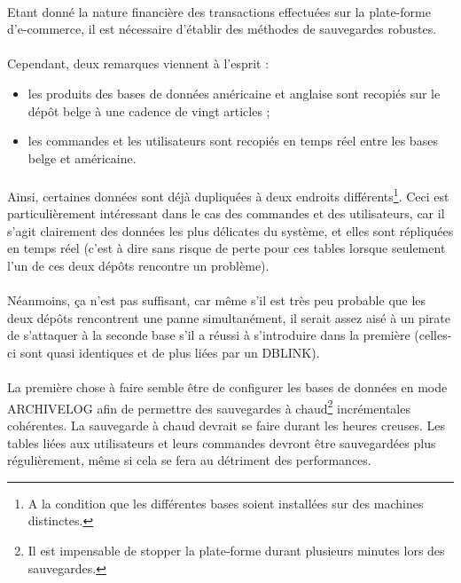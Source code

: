 \documentclass[a4paper,12pt,french]{article}
\begin{document}
    \paragraph{}
    Etant donné la nature financière des transactions effectuées sur la
plate-forme d'e-commerce, il est nécessaire d'établir des méthodes de
sauvegardes robustes. 

    \paragraph{}
    Cependant, deux remarques viennent à l'esprit :
    \begin{itemize}
        \item les produits des bases de données américaine et anglaise sont
recopiés sur le dépôt belge à une cadence de vingt articles ;
        \item les commandes et les utilisateurs sont recopiés en temps réel
entre les bases belge et américaine.
    \end{itemize}

    \paragraph{}
    Ainsi, certaines données sont déjà dupliquées à deux endroits
différents\footnote{A la condition que les différentes bases soient installées
sur des machines distinctes.}. Ceci est particulièrement intéressant dans le
cas des commandes et des utilisateurs, car il s'agit clairement des données les
plus délicates du système, et elles sont répliquées en temps réel (c'est à
dire sans risque de perte pour ces tables lorsque seulement l'un de ces deux
dépôts rencontre un problème).

    \paragraph{}
    Néanmoins, ça n'est pas suffisant, car même s'il est très peu probable que
les deux dépôts rencontrent une panne simultanément, il serait assez aisé à un
pirate de s'attaquer à la seconde base s'il a réussi à s'introduire dans la
première (celles-ci sont quasi identiques et de plus liées par un DBLINK).

    \paragraph{}
    La première chose à faire semble être de configurer les bases de données en
mode ARCHIVELOG afin de permettre des sauvegardes à chaud\footnote{Il est
impensable de stopper la plate-forme durant plusieurs minutes lors des
sauvegardes.} incrémentales cohérentes. La sauvegarde à chaud devrait se faire
durant les heures creuses. Les tables liées aux utilisateurs et leurs commandes
devront être sauvegardées plus régulièrement, même si cela se fera au détriment
des performances. 
\end{document}
